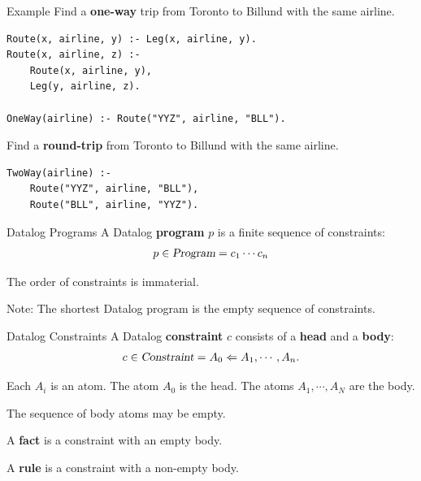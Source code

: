 \begin{frame}[fragile]{Example}
Find a \textbf{one-way} trip from Toronto to Billund with the same airline.

\begin{lstlisting}[language=flix, xleftmargin=0.8cm]
Route(x, airline, y) :- Leg(x, airline, y).
Route(x, airline, z) :- 
    Route(x, airline, y),
    Leg(y, airline, z).

OneWay(airline) :- Route("YYZ", airline, "BLL").
\end{lstlisting}

\pause

Find a \textbf{round-trip} from Toronto to Billund with the same airline.

\begin{lstlisting}[language=flix, xleftmargin=0.8cm]
TwoWay(airline) :- 
    Route("YYZ", airline, "BLL"), 
    Route("BLL", airline, "YYZ").
\end{lstlisting}
\end{frame}

\begin{frame}{Datalog Programs}
A Datalog \textbf{program} $p$ is a finite sequence of constraints:
%
{\Large
\begin{align*}
p \in \textsl{Program} = c_1 \cdots c_n
\end{align*}
}

\pause

The order of constraints is immaterial.

\pause

Note: The shortest Datalog program is the empty sequence of constraints.
\end{frame}

\begin{frame}{Datalog Constraints}
A Datalog \textbf{constraint} $c$ consists of a \textbf{head} and a \textbf{body}:
%
{\Large
\begin{align*}
c \in \textsl{Constraint} = A_0 \Leftarrow A_1, \cdots, A_n.
\end{align*}
}

\pause

Each $A_i$ is an atom. The atom $A_0$ is the head. The atoms $A_1, \cdots, A_N$ are the body. 

\pause

The sequence of body atoms may be empty.

\pause

A \textbf{fact} is a constraint with an empty body.

A \textbf{rule} is a constraint with a non-empty body.
\end{frame}

